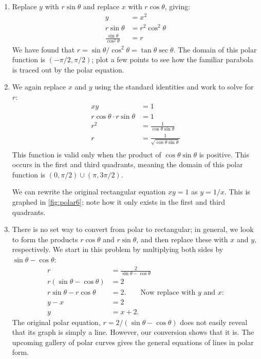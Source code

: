 {\begin{enumerate}
	\item Replace $y$ with $r\sin\theta$ and replace $x$ with $r\cos\theta$, giving:
	\begin{align*}
	y &=x^2\\
	r\sin\theta &= r^2\cos^2\theta\\
	\frac{\sin\theta}{\cos^2\theta} &= r
	\end{align*}
	We have found that $r=\sin\theta/\cos^2\theta = \tan\theta\sec\theta$. The domain of this polar function is $(-\pi/2,\pi/2)$; plot a few points to see how the familiar parabola is traced out by the polar equation.
	
	\item		We again replace $x$ and $y$ using the standard identities and work to solve for $r$:
	\begin{align*}
	xy &= 1 \\
	r\cos\theta\cdot r\sin\theta & = 1\\
	r^2 & = \frac{1}{\cos\theta\sin\theta}\\
	r & = \frac{1}{\sqrt{\cos\theta\sin\theta}}\\
	\end{align*}
	This function is valid only when the product of $\cos\theta\sin\theta$ is positive. This occurs in the first and third quadrants, meaning the domain of this polar function is $(0,\pi/2) \cup (\pi,3\pi/2)$.
	
	We can rewrite the original rectangular equation $xy=1$ as $y=1/x$. This is graphed in \autoref{fig:polar6}; note how it only exists in the first and third quadrants.
		
	\item		There is no set way to convert from polar to rectangular; in general, we look to form the products $r\cos \theta$ and $r\sin\theta$, and then replace these with $x$ and $y$, respectively. We start in this problem by multiplying both sides by $\sin\theta-\cos\theta$:
	\begin{align*}
	r &= \frac{2}{\sin\theta-\cos\theta} \\
	r(\sin\theta-\cos\theta) &= 2\\
	r\sin\theta-r\cos\theta &= 2. \qquad \text{Now replace with $y$ and $x$:}\\
	y-x &= 2\\
	y &= x+2.
	\end{align*}
	The original polar equation, $r=2/(\sin\theta-\cos\theta)$ does not easily reveal that its graph is simply a line. However, our conversion shows that it is. The upcoming gallery of polar curves gives the general equations of lines in polar form.


\end{enumerate}}
